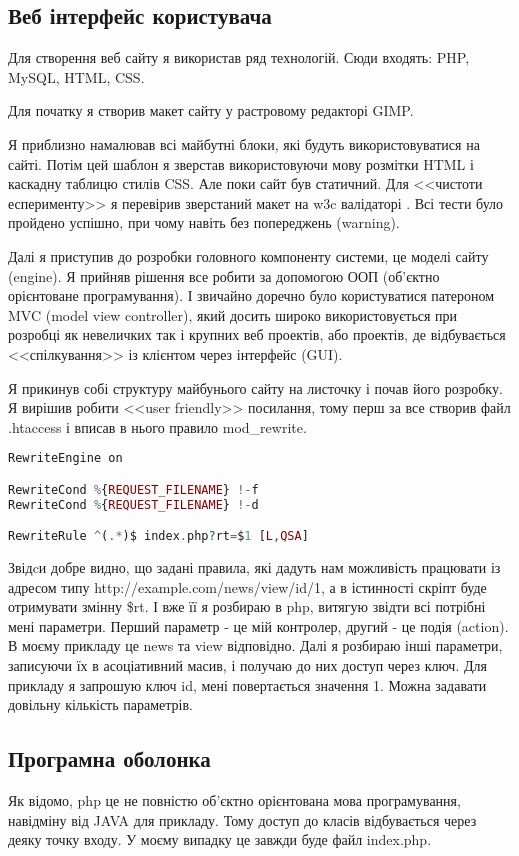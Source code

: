 \subsection{Веб інтерфейс користувача}
Для створення веб сайту я використав ряд технологій. Сюди входять: PHP, MySQL, HTML, CSS. 
\par Для початку я створив макет сайту у растровому редакторі GIMP. 
\par Я приблизно намалював всі майбутні блоки, які будуть використовуватися на сайті. Потім цей шаблон я зверстав використовуючи мову розмітки HTML і каскадну таблицю стилів CSS. Але поки сайт був статичний. Для <<чистоти есперименту>> я перевірив зверстаний макет на w3c валідаторі \cite{w3c}. Всі тести було пройдено успішно, при чому навіть без попереджень (warning).
\par Далі я приступив до розробки головного компоненту системи, це моделі сайту (engine). Я прийняв рішення все робити за допомогою ООП (об'єктно орієнтоване програмування). І звичайно доречно було користуватися патероном MVC (model view controller), який досить широко використовується при розробці як невеличких так і крупних веб проектів, або проектів, де відбувається <<спілкування>> із клієнтом через інтерфейс (GUI).
\par Я прикинув собі структуру майбунього сайту на листочку і почав його розробку. Я вирішив робити <<user friendly>> посилання, тому перш за все створив файл .htaccess і вписав в нього правило mod\_rewrite.

\begin{lstlisting}[language=PHP]
RewriteEngine on

RewriteCond %{REQUEST_FILENAME} !-f
RewriteCond %{REQUEST_FILENAME} !-d

RewriteRule ^(.*)$ index.php?rt=$1 [L,QSA]
\end{lstlisting}

Звідcи добре видно, що задані правила, які дадуть нам можливість працювати із адресом типу http://example.com/news/view/id/1, а в істинності скріпт буде отримувати змінну \$rt. І вже її я розбираю в php, витягую звідти всі потрібні мені параметри. Перший параметр - це мій контролер, другий - це подія (action). В моєму прикладу це news та view відповідно. Далі я розбираю інші параметри, записуючи їх в асоціативний масив, і получаю до них доступ через ключ. Для прикладу я запрошую ключ id, мені повертається значення 1. Можна задавати довільну кількість параметрів.

\subsection{Програмна оболонка} 
Як відомо, php це не повністю об'єктно орієнтована мова програмування, навідміну від JAVA для прикладу. Тому доступ до класів відбувається через деяку точку входу. У моєму випадку це завжди буде файл index.php. 

